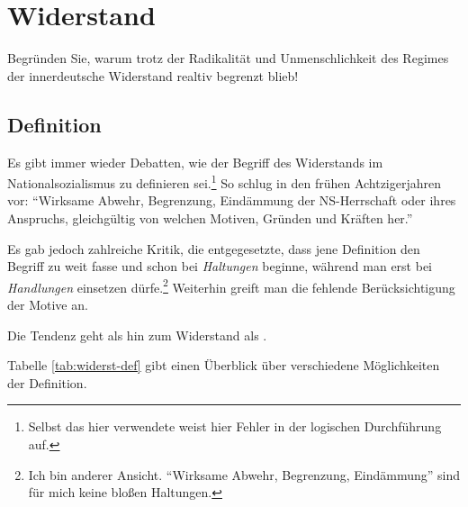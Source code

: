 \section[Widerstand]{Widerstand}
\label{sec:widerstand}

\begin{aufgabe}
Begründen Sie, warum trotz der Radikalität und Unmenschlichkeit des
Regimes der innerdeutsche Widerstand realtiv begrenzt blieb! 
\end{aufgabe}

\subsection[Definition]{Definition}

Es gibt immer wieder Debatten, wie der Begriff des Widerstands im
Nationalsozialismus zu definieren sei.\footnote{Selbst das hier
verwendete \cite{WidDefschwieBeg} weist hier Fehler in der logischen
Durchführung auf.} So schlug  in
den frühen Achtzigerjahren vor: \enquote{Wirksame Abwehr, Begrenzung,
Eindämmung der NS-Herrschaft oder ihres Anspruchs, gleichgültig von
welchen Motiven, Gründen und Kräften her.}

Es gab jedoch zahlreiche Kritik, die entgegesetzte, dass jene
Definition den Begriff zu weit fasse und schon bei \emph{Haltungen}
beginne, während man erst bei \emph{Handlungen} einsetzen
dürfe.\footnote{Ich bin anderer Ansicht. \enquote{Wirksame Abwehr,
Begrenzung, Eindämmung} sind für mich keine bloßen Haltungen.}
Weiterhin greift man die fehlende Berücksichtigung der Motive an.

Die Tendenz geht als hin zum Widerstand als
.

Tabelle \ref{tab:widerst-def} gibt einen Überblick über verschiedene
Möglichkeiten der Definition.

